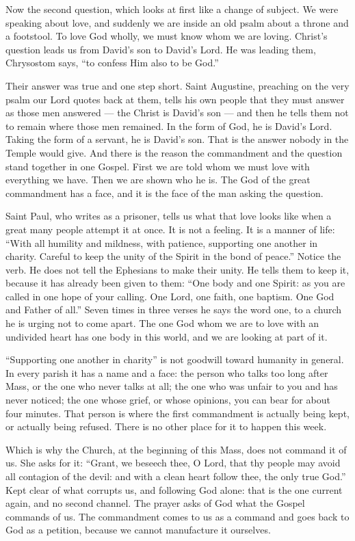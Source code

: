 \bigskip

Now the second question, which looks at first like a change of subject. We
were speaking about love, and suddenly we are inside an old psalm about a
throne and a footstool. To love God wholly, we must know whom we are loving.
Christ's question leads us from David's son to David's Lord. He was leading
them, Chrysostom says, ``to confess
Him also to be God.''

Their answer was true and one step short. Saint Augustine,
preaching on the very psalm our Lord quotes back at them, tells his own people
that they must answer as those men answered --- the Christ is David's son ---
and then he tells them not to remain where those men remained. In the form of
God, he is David's Lord. Taking the form of a servant, he is David's son.
That is the answer nobody in the Temple would give. And there is the reason
the commandment and the question stand together in one Gospel. First we are
told whom we must love with everything we have. Then we are shown who he is. The God of the great
commandment has a face, and it is the face of the man asking the question.

\bigskip

Saint Paul, who writes as a prisoner, tells us what that love looks like
when a great many people attempt it at once. It is not a feeling. It is a
manner of life: ``With all humility and mildness, with patience, supporting
one another in charity. Careful to keep the unity of the Spirit in the bond
of peace.'' Notice the verb. He does not tell the Ephesians to make their
unity. He tells them to keep it, because it has already been given to them:
``One body and one Spirit: as you are called in one hope of your calling. One
Lord, one faith, one baptism. One God and Father of all.'' Seven times in
three verses he says the word one, to a church he is urging not to come
apart. The one God whom we are to love with an undivided heart has one body in
this world, and we are looking at part of it.

``Supporting one another in charity'' is not goodwill toward humanity in
general. In every parish it has a name and a face: the person who talks too
long after Mass, or the one who never talks at all; the one who was unfair to
you and has never noticed; the one whose grief, or whose opinions, you can
bear for about four minutes. That person is where the first
commandment is actually being kept, or actually being refused. There is no
other place for it to happen this week.

Which is why the Church, at the beginning of this Mass, does not command it
of us. She asks for it: ``Grant, we beseech thee, O Lord, that thy people may
avoid all contagion of the devil: and with a clean heart follow thee, the
only true God.'' Kept clear of what corrupts us, and following God alone:
that is the one current again, and no second channel. The prayer asks of God
what the Gospel commands of us. The commandment comes to us as a command and
goes back to God as a petition,
because we cannot manufacture it ourselves.

